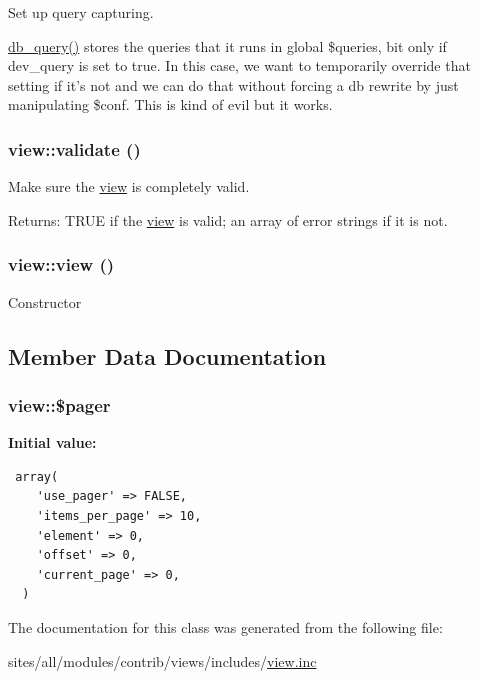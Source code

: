 Set up query capturing.

\hyperlink{database_8mysql-common_8inc_9e096321b86945d128746ac7bedce8f3}{db\_\-query()} stores the queries that it runs in global \$queries, bit only if dev\_\-query is set to true. In this case, we want to temporarily override that setting if it's not and we can do that without forcing a db rewrite by just manipulating \$conf. This is kind of evil but it works. \hypertarget{classview_89950e757cb2da5094b1d413991fc353}{
\subsubsection[{validate}]{\setlength{\rightskip}{0pt plus 5cm}view::validate ()}}
\label{classview_89950e757cb2da5094b1d413991fc353}


Make sure the \hyperlink{classview}{view} is completely valid.

\begin{Desc}
\item[Returns:]TRUE if the \hyperlink{classview}{view} is valid; an array of error strings if it is not. \end{Desc}
\hypertarget{classview_26e74a2bf85d7af45346359134f9f85d}{
\subsubsection[{view}]{\setlength{\rightskip}{0pt plus 5cm}view::view ()}}
\label{classview_26e74a2bf85d7af45346359134f9f85d}


Constructor 

\subsection{Member Data Documentation}
\hypertarget{classview_1065547f3219d00f15a833ec1a666c8b}{
\subsubsection[{\$pager}]{\setlength{\rightskip}{0pt plus 5cm}view::\$pager}}
\label{classview_1065547f3219d00f15a833ec1a666c8b}


\textbf{Initial value:}

\begin{Code}\begin{verbatim} array(
    'use_pager' => FALSE,
    'items_per_page' => 10,
    'element' => 0,
    'offset' => 0,
    'current_page' => 0,
  )
\end{verbatim}
\end{Code}


The documentation for this class was generated from the following file:\begin{CompactItemize}
\item 
sites/all/modules/contrib/views/includes/\hyperlink{view_8inc}{view.inc}\end{CompactItemize}
